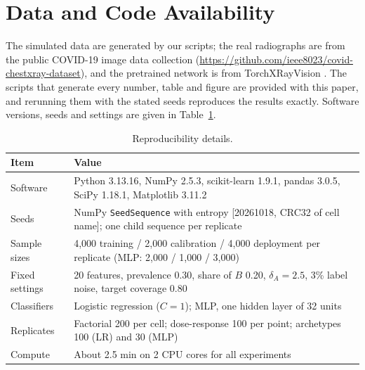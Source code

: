 \documentclass[conference]{IEEEtran}
\begin{document}
\section*{Data and Code Availability}
The simulated data are generated by our scripts; the real radiographs are from the public COVID-19 image data collection \cite{cohen2020covid} (\url{https://github.com/ieee8023/covid-chestxray-dataset}), and the pretrained network is from TorchXRayVision \cite{cohen2021xrv}. The scripts that generate every number, table and figure are provided with this paper, and rerunning them with the stated seeds reproduces the results exactly. Software versions, seeds and settings are given in Table~\ref{tab:repro}.
\begin{table}[!t]
\centering
\caption{Reproducibility details.}\label{tab:repro}
\footnotesize
\begin{tabular}{@{}p{1.7cm}p{6.1cm}@{}}
\toprule
Item & Value \\
\midrule
Software & Python 3.13.16, NumPy 2.5.3, scikit-learn 1.9.1, pandas 3.0.5, SciPy 1.18.1, Matplotlib 3.11.2 \\
Seeds & NumPy \texttt{SeedSequence} with entropy [20261018, CRC32 of cell name]; one child sequence per replicate \\
Sample sizes & 4,000 training / 2,000 calibration / 4,000 deployment per replicate (MLP: 2,000 / 1,000 / 3,000) \\
Fixed settings & 20 features, prevalence 0.30, share of $B$ 0.20, $\delta_A = 2.5$, 3\% label noise, target coverage 0.80 \\
Classifiers & Logistic regression ($C=1$); MLP, one hidden layer of 32 units \\
Replicates & Factorial 200 per cell; dose-response 100 per point; archetypes 100 (LR) and 30 (MLP) \\
Compute & About 2.5 min on 2 CPU cores for all experiments \\
\bottomrule
\end{tabular}
\end{table}




\end{document}

